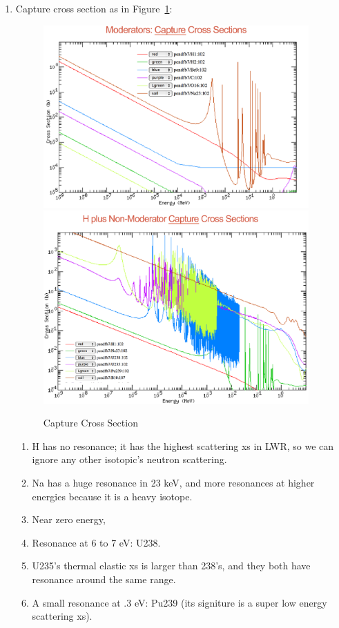 \documentclass{school-22.211-notes}
\begin{document}
\begin{enumerate}
\item Capture cross section as in Figure~\ref{capture-xs}: 
\begin{figure}
  \centering
  \includegraphics[width=4in]{images/capture-xs.png}
  \\
  \includegraphics[width=4in]{images/capture-xs-2.png}
  \caption{Capture Cross Section} \label{capture-xs}
\end{figure}
\begin{enumerate}
\item H has no resonance; it has the highest scattering xs in LWR, so we can ignore any other isotopic's neutron scattering.   
\item Na has a huge resonance in 23 keV, and more resonances at higher energies because it is a heavy isotope.
\item Near zero energy,
\item Resonance at 6 to 7 eV: U238. 
\item U235's thermal elastic xs is larger than 238's, and they both have resonance around the same range.   
\item A small resonance at .3 eV: Pu239 (its signiture is a super low energy scattering xs). 
\end{enumerate}


\end{enumerate}
\end{document}
